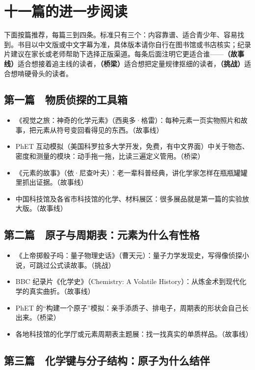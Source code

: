 \section{十一篇的进一步阅读}

下面按篇推荐，每篇三到四条。标准只有三个：内容靠谱、适合青少年、容易找到。书目以中文版或中文字幕为准，具体版本请你自行在图书馆或书店核实；纪录片建议在家长或老师帮助下选择正版渠道。每条后面注明它更适合谁——\textbf{（故事线）}适合想接着追主线的读者，\textbf{（桥梁）}适合想把定量规律抠细的读者，\textbf{（挑战）}适合想啃硬骨头的读者。

\subsection*{第一篇　物质侦探的工具箱}

\begin{itemize}[itemsep=2pt]
\item 《视觉之旅：神奇的化学元素》（西奥多·格雷）：每种元素一页实物照片和故事，把元素从符号变回看得见的东西。（故事线）
\item PhET 互动模拟（美国科罗拉多大学开发，免费，有中文界面）中关于物态、密度和测量的模块：动手拖一拖，比读三遍定义管用。（桥梁）
\item 《元素的故事》（依·尼查叶夫）：老一辈科普经典，讲化学家怎样在瓶瓶罐罐里抓出证据。（故事线）
\item 中国科技馆及各省市科技馆的化学、材料展区：很多展品就是第一篇的实验放大版。（故事线）
\end{itemize}

\subsection*{第二篇　原子与周期表：元素为什么有性格}

\begin{itemize}[itemsep=2pt]
\item 《上帝掷骰子吗：量子物理史话》（曹天元）：量子力学发现史，写得像侦探小说，可跳过公式读故事。（挑战）
\item BBC 纪录片《化学史》（Chemistry: A Volatile History）：从炼金术到现代化学的真实曲折。（故事线）
\item PhET 的“构建一个原子”模拟：亲手添质子、排电子，周期表的形状会自己长出来。（桥梁）
\item 各地科技馆的化学厅或元素周期表主题展：找一找真实的单质样品。（故事线）
\end{itemize}

\subsection*{第三篇　化学键与分子结构：原子为什么结伴}

